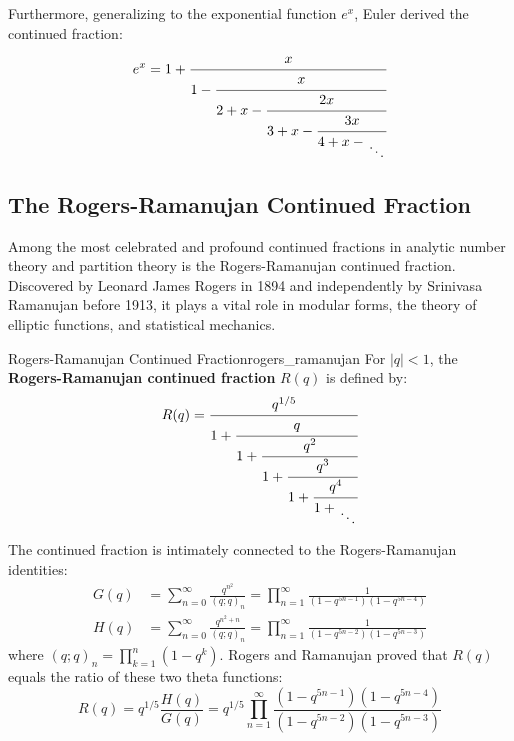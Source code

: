 \documentclass[a4paper]{article}
\begin{document}
Furthermore, generalizing to the exponential function $e^x$, Euler derived the continued fraction:
\[
  e^x = 1 + \cfrac{x}{1 - \cfrac{x}{2 + x - \cfrac{2x}{3 + x - \cfrac{3x}{4 + x - \CFDots}}}}
\]

\subsection{The Rogers-Ramanujan Continued Fraction}\label{cf:subsec:rogers-ramanujan}
Among the most celebrated and profound continued fractions in analytic number theory and partition theory is the Rogers-Ramanujan continued fraction.
Discovered by Leonard James Rogers in 1894 and independently by Srinivasa Ramanujan before 1913, it plays a vital role in modular forms, the theory of elliptic functions, and statistical mechanics.

\begin{mydefinition}{Rogers-Ramanujan Continued Fraction}{rogers_ramanujan}
  For $|q| < 1$, the \textbf{Rogers-Ramanujan continued fraction} $R(q)$ is defined by:
  \[
    R(q) = \cfrac{q^{1/5}}{1 + \cfrac{q}{1 + \cfrac{q^2}{1 + \cfrac{q^3}{1 + \cfrac{q^4}{1 + \CFDots}}}}}
  \]
\end{mydefinition}

The continued fraction is intimately connected to the Rogers-Ramanujan identities:
\begin{align*}
  G(q) & = \sum_{n=0}^\infty \frac{q^{n^2}}{(q; q)_n} = \prod_{n=1}^\infty \frac{1}{(1 - q^{5n-1})(1 - q^{5n-4})} \\
  H(q) & = \sum_{n=0}^\infty \frac{q^{n^2+n}}{(q; q)_n} = \prod_{n=1}^\infty \frac{1}{(1 - q^{5n-2})(1 - q^{5n-3})}
\end{align*}
where $(q; q)_n = \prod_{k=1}^n (1 - q^k)$.
Rogers and Ramanujan proved that $R(q)$ equals the ratio of these two theta functions:
\[
  R(q) = q^{1/5} \frac{H(q)}{G(q)} = q^{1/5} \prod_{n=1}^\infty \frac{(1 - q^{5n-1})(1 - q^{5n-4})}{(1 - q^{5n-2})(1 - q^{5n-3})}
\]
\end{document}
